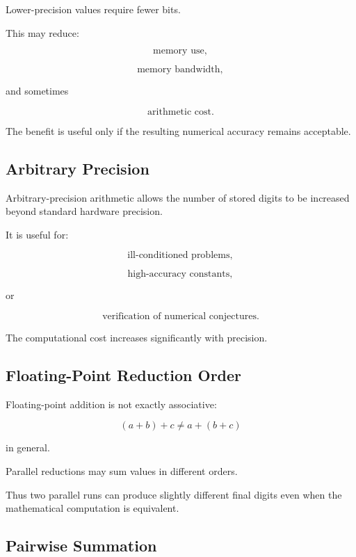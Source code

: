 Lower-precision values require fewer bits.

This may reduce:

\[
\boxed{
\text{memory use},
}
\]

\[
\boxed{
\text{memory bandwidth},
}
\]

and sometimes

\[
\boxed{
\text{arithmetic cost}.
}
\]

The benefit is useful only if the resulting numerical accuracy remains
acceptable.

\subsection{Arbitrary Precision}
\label{subsec:arbitrary-precision}

Arbitrary-precision arithmetic allows the number of stored digits to be
increased beyond standard hardware precision.

It is useful for:

\[
\boxed{
\text{ill-conditioned problems},
}
\]

\[
\boxed{
\text{high-accuracy constants},
}
\]

or

\[
\boxed{
\text{verification of numerical conjectures}.
}
\]

The computational cost increases significantly with precision.

\subsection{Floating-Point Reduction Order}
\label{subsec:floating-point-reduction-order}

Floating-point addition is not exactly associative:

\[
\boxed{
(a+b)+c
\neq
a+(b+c)
}
\]

in general.

Parallel reductions may sum values in different orders.

Thus two parallel runs can produce slightly different final digits even
when the mathematical computation is equivalent.

\subsection{Pairwise Summation}
\label{subsec:pairwise-summation}

